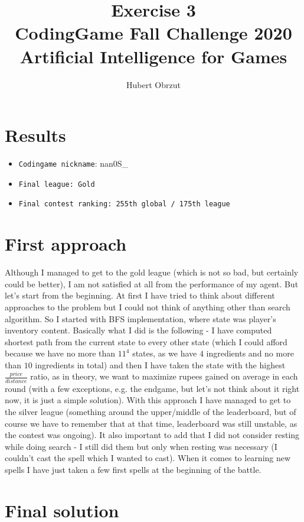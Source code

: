 \documentclass[11pt]{article}
\title{
	Exercise 3 \\
	CodingGame Fall Challenge 2020 \\
	Artificial Intelligence for Games \\
}
\author{Hubert Obrzut}
\begin{document}
	\maketitle
	
	\section{Results}
	
	\begin{itemize}
 		\item[] \texttt{Codingame nickname}: nan0S\_
 		\item[] \texttt{Final league: Gold}
 		\item[] \texttt{Final contest ranking: 255th global / 175th league}
 	\end{itemize}
 	
 	\section{First approach}
	
	Although I managed to get to the gold league (which is not so bad, but certainly could be better), I am not satisfied at all from the performance of my agent. But let's start from the beginning. At first I have tried to think about different approaches to the problem but I could not think of anything other than search algorithm. So I started with BFS implementation, where state was player's inventory content. Basically what I did is the following - I have computed shortest path from the current state to every other state (which I could afford because we have no more than $11^4$ states, as we have $4$ ingredients and no more than $10$ ingredients in total) and then I have taken the state with the highest $\frac{price}{distance}$ ratio, as in theory, we want to maximize rupees gained on average in each round (with a few exceptions, e.g. the endgame, but let's not think about it right now, it is just a simple solution). With this approach I have managed to get to the silver league (something around the upper/middle of the leaderboard, but of course we have to remember that at that time, leaderboard was still unstable, as the contest was ongoing). It also important to add that I did not consider resting while doing search - I still did them but only when resting was necessary (I couldn't cast the spell which I wanted to cast). When it comes to learning new spells I have just taken a few first spells at the beginning of the battle.
	
	\section{Final solution}
	
\end{document}
